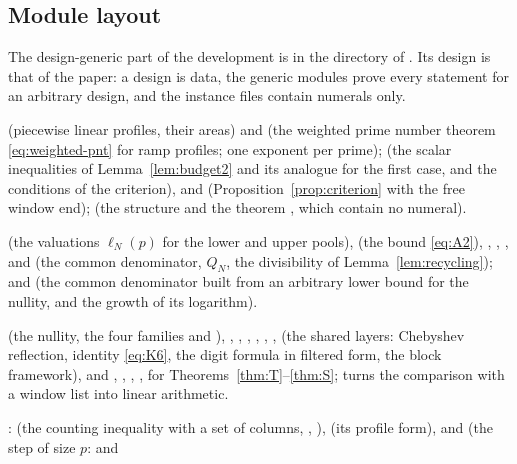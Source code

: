\subsection{Module layout}
The design-generic part of the development is in the directory  of . Its design is that of the paper:
a design is data, the generic modules prove every statement for an arbitrary design, and the instance
files contain numerals only.
\begin{description}[leftmargin=1.5em,style=nextline]
\item[Generic layer]  (piecewise linear profiles, their areas) and  (the
weighted prime number theorem \eqref{eq:weighted-pnt} for ramp profiles; one exponent per prime);
 (the scalar inequalities of Lemma~\ref{lem:budget2} and its analogue for the first case, and the
conditions of the criterion),  and  (Proposition~\ref{prop:criterion} with the free
window end);  (the structure  and the theorem , which
contain no numeral).
\item[Denominators]  (the valuations $\ell_N(p)$ for the lower and upper pools),
 (the bound \eqref{eq:A2}), , , ,
 and  (the common denominator, $Q_N$, the divisibility of
Lemma~\ref{lem:recycling});  and  (the common denominator
 built from an arbitrary lower bound for the nullity, and the growth of its
logarithm).
\item[Closed formulas]  (the nullity, the four families and ),
, , , , , ,
 (the shared layers: Chebyshev reflection, identity \eqref{eq:K6}, the digit formula in
filtered form, the block framework), and , , , ,
 for Theorems~\ref{thm:T}--\ref{thm:S};  turns the comparison with a window list
into linear arithmetic.
\item[Counting inequality and families] :  (the counting inequality with a set of
columns, , ),  (its profile form),  and
 (the step of size $p$:  and

\end{description}
